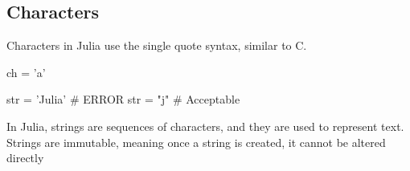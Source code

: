 \documentclass{report}
\begin{document}

    \pagebreak 
    \bigbreak \noindent 
    \subsection{Characters}
    \bigbreak \noindent 
    Characters in Julia use the single quote syntax, similar to C.
    \begin{jlcode}
    ch = 'a'

    str = 'Julia' # ERROR
    str = "j" # Acceptable
    \end{jlcode}
    \bigbreak \noindent
    In Julia, strings are sequences of characters, and they are used to represent text. Strings are immutable, meaning once a string is created, it cannot be altered directly
    \bigbreak \noindent 
\end{document}
